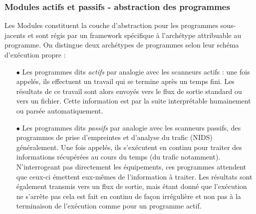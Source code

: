 \documentclass[]{article}
\begin{document}
\subsubsection{Modules actifs et passifs - abstraction des programmes}

Les Modules constituent la couche d'abstraction pour les programmes sous-jacents et sont régis par un framework spécifique à l'archétype attribuable au programme. On distingue deux archétypes de programmes selon leur schéma d'exécution propre :\\
\begin{itemize}
\item[$\bullet$] Les programmes dits \textit{actifs} par analogie avec les scanneurs actifs : une fois appelés, ils effectuent un travail qui se termine après un temps fini. Les résultats de ce travail sont alors envoyés vers le flux de sortie standard ou vers un fichier. Cette information est par la suite interprétable humainement ou parsée automatiquement.
\vspace{0.2cm}
\item[$\bullet$] Les programmes dits \textit{passifs} par analogie avec les scanneurs passifs, des programmes de prise d'empreintes et d'analyse du trafic (NIDS) généralement. Une fois appelés, ils s'exécutent en continu pour traiter des informations récupérées au cours du temps (du trafic notamment). N'interrogeant pas directement les équipements, ces programmes attendent que ceux-ci émettent eux-mêmes de l'information à traiter. Les résultats sont également transmis vers un flux de sortie, mais étant donné que l'exécution ne s'arrête pas cela est fait en continu de façon irrégulière et non pas à la terminaison de l'exécution comme pour un programme actif. 
\end{itemize}
\vspace{0.4cm}
\end{document}

